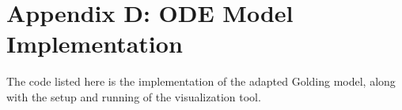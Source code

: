 \chapter{Appendix D: ODE Model Implementation}
\label{AppendixD}

The code listed here is the implementation of the adapted Golding model,  along with the setup and running of the visualization tool. 

